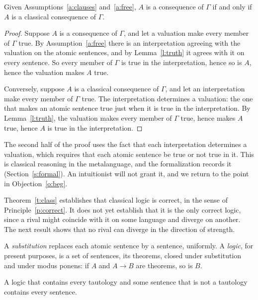 \documentclass{situationist-preprint}
\begin{document}
\begin{theorem}\label{t:class}
Given Assumptions~\ref{a:clauses} and~\ref{a:free}, $A$ is a consequence of $\Gamma$ if and only if $A$ is a classical consequence of $\Gamma$.
\end{theorem}

\begin{proof}
Suppose $A$ is a consequence of $\Gamma$, and let a valuation make every member of $\Gamma$ true. By Assumption~\ref{a:free} there is an interpretation agreeing with the valuation on the atomic sentences, and by Lemma~\ref{l:truth} it agrees with it on every sentence. So every member of $\Gamma$ is true in the interpretation, hence so is $A$, hence the valuation makes $A$ true.

Conversely, suppose $A$ is a classical consequence of $\Gamma$, and let an interpretation make every member of $\Gamma$ true. The interpretation determines a valuation: the one that makes an atomic sentence true just when it is true in the interpretation. By Lemma~\ref{l:truth}, the valuation makes every member of $\Gamma$ true, hence makes $A$ true, hence $A$ is true in the interpretation.
\end{proof}

The second half of the proof uses the fact that each interpretation determines a valuation, which requires that each atomic sentence be true or not true in it. This is classical reasoning in the metalanguage, and the formalization records it (Section~\ref{s:formal}). An intuitionist will not grant it, and we return to the point in Objection~\ref{o:beg}.

Theorem~\ref{t:class} establishes that classical logic is correct, in the sense of Principle~\ref{p:correct}. It does not yet establish that it is the only correct logic, since a rival might coincide with it on some language and diverge on another. The next result shows that no rival can diverge in the direction of strength.

\begin{definition}\label{d:logic}
A \emph{substitution} replaces each atomic sentence by a sentence, uniformly. A \emph{logic}, for present purposes, is a set of sentences, its theorems, closed under substitution and under modus ponens: if $A$ and $A \to B$ are theorems, so is $B$.
\end{definition}

\begin{theorem}\label{t:post}
A logic that contains every tautology and some sentence that is not a tautology contains every sentence.
\end{theorem}
\end{document}
